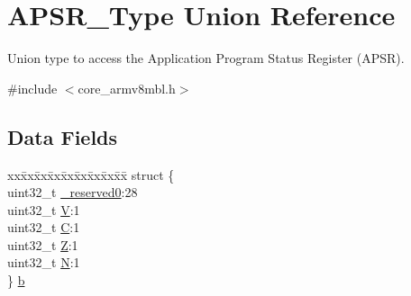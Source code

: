 \hypertarget{union_a_p_s_r___type}{}\section{A\+P\+S\+R\+\_\+\+Type Union Reference}
\label{union_a_p_s_r___type}


Union type to access the Application Program Status Register (A\+P\+SR).  




{\ttfamily \#include $<$core\+\_\+armv8mbl.\+h$>$}

\subsection*{Data Fields}
\begin{DoxyCompactItemize}
\item 
\begin{tabbing}
xx\=xx\=xx\=xx\=xx\=xx\=xx\=xx\=xx\=\kill
struct \{\\
\>uint32\_t \mbox{\hyperlink{union_a_p_s_r___type_ac8a6a13838a897c8d0b8bc991bbaf7c1}{\_reserved0}}:28\\
\>uint32\_t \mbox{\hyperlink{union_a_p_s_r___type_acd4a2b64faee91e4a9eef300667fa222}{V}}:1\\
\>uint32\_t \mbox{\hyperlink{union_a_p_s_r___type_a7a1caf92f32fe9ebd8d1fe89b06c7776}{C}}:1\\
\>uint32\_t \mbox{\hyperlink{union_a_p_s_r___type_a5ae954cbd9986cd64625d7fa00943c8e}{Z}}:1\\
\>uint32\_t \mbox{\hyperlink{union_a_p_s_r___type_abae0610bc2a97bbf7f689e953e0b451f}{N}}:1\\
\} \mbox{\hyperlink{union_a_p_s_r___type_a9dbe3d4a8983684f38d0fd2d68299eea}{b}}\\


\end{tabbing}
\end{DoxyCompactItemize}
